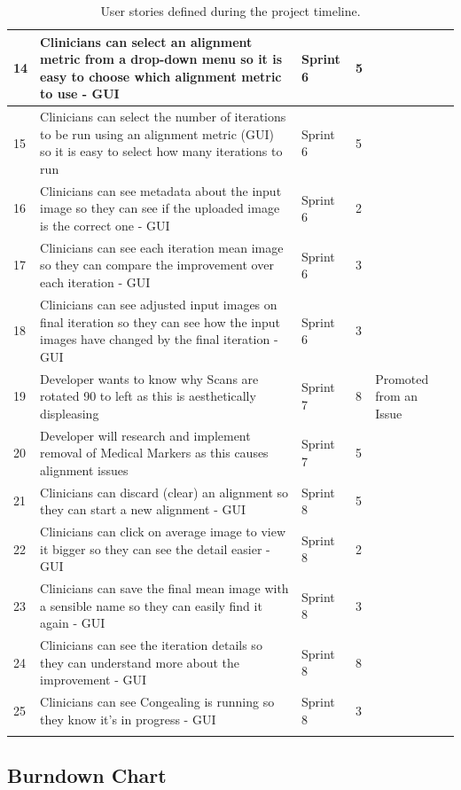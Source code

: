 \begin{center}
\begin{longtable}{| p{2cm} | p{4cm} | p{2cm}  | p{2cm} | p{3cm} |}
      14 & Clinicians can select an alignment metric from a drop-down menu so it is easy to choose which alignment metric to use - \acrshort{GUI} & Sprint 6 & 5 & \\ \hline
      15 & Clinicians can select the number of iterations to be run using an alignment metric (GUI) so it is easy to select how many iterations to run & Sprint 6 & 5 & \\ \hline
      16 & Clinicians can see metadata about the input image so they can see if the uploaded image is the correct one - \acrshort{GUI} & Sprint 6 & 2 & \\ \hline
      17 & Clinicians can see each iteration mean image so they can compare the improvement over each iteration - \acrshort{GUI} & Sprint 6 & 3 & \\ \hline
      18 & Clinicians can see adjusted input images on final iteration so they can see how the input images have changed by the final iteration - \acrshort{GUI} & Sprint 6 & 3 & \\ \hline
      19 & Developer wants to know why Scans are rotated 90 to left as this is aesthetically displeasing & Sprint 7 & 8 & Promoted from an Issue \\ \hline
      20 & Developer will research and implement removal of Medical Markers as this causes alignment issues & Sprint 7 & 5 & \\ \hline
      21 & Clinicians can discard (clear) an alignment so they can start a new alignment - \acrshort{GUI} & Sprint 8 & 5 & \\ \hline
      22 & Clinicians can click on average image to view it bigger so they can see the detail easier - \acrshort{GUI} & Sprint 8 & 2 & \\ \hline
      23 & Clinicians can save the final mean image with a sensible name so they can easily find it again - \acrshort{GUI} & Sprint 8 & 3 & \\ \hline
      24 & Clinicians can see the iteration details so they can understand more about the improvement - \acrshort{GUI} & Sprint 8 & 8 & \\ \hline
      25 & Clinicians can see \Gls{Congealing} is running so they know it's in progress - \acrshort{GUI} & Sprint 8 & 3 & \\ \hline
  \caption{User stories defined during the project timeline.}
  \label{table:User Stories}
\end{longtable}
\end{center}
\subsection{Burndown Chart}

